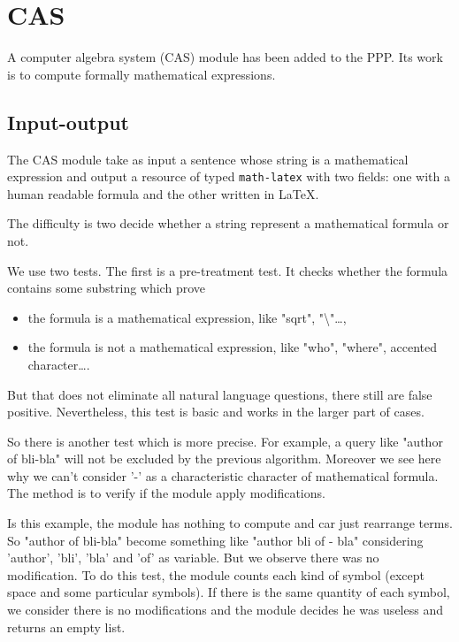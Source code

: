 \newcommand{\CalChAS}{\text{C}\hspace{-2pt}_{\text{AL}}\hspace{-3pt}\text{C}^{\text{H}}{\hspace{-4pt}}_\text{AS}}
\newcommand{\RR}{\mathbb{R}}
\newcommand{\CC}{\mathbb{C}}
\newcommand{\ZZ}{\mathbb{Z}}
\newcommand{\NN}{\mathbb{N}}

\section{CAS}

A computer algebra system (CAS) module has been added to the PPP. Its work is to compute formally mathematical expressions.

\subsection{Input-output}

The CAS module take as input a sentence whose string is a mathematical expression and output a resource of typed \texttt{math-latex} with two fields: one with a human readable formula and the other written in \LaTeX.

The difficulty is two decide whether a string represent a mathematical formula or not.

We use two tests. The first is a pre-treatment test. It checks whether the formula contains some substring which prove
\begin{itemize}
    \item the formula is a mathematical expression, like "sqrt", "\textbackslash"\ldots,
    \item the formula is not a mathematical expression, like "who", "where", accented character\ldots.
\end{itemize}

But that does not eliminate all natural language questions, there still are false positive. Nevertheless, this test is basic and works in the larger part of cases.

\bigskip

So there is another test which is more precise. For example, a query like "author of bli-bla" will not be excluded by the previous algorithm. Moreover we see here why we can't consider '-' as a characteristic character of mathematical formula. The method is to verify if the module apply modifications.

Is this example, the module has nothing to compute and car just rearrange terms. So "author of bli-bla" become something like "author bli of - bla" considering 'author', 'bli', 'bla' and 'of' as variable. But we observe there was no modification. To do this test, the module counts each kind of symbol (except space and some particular symbols). If there is the same quantity of each symbol, we consider there is no modifications and the module decides he was useless and returns an empty list.

